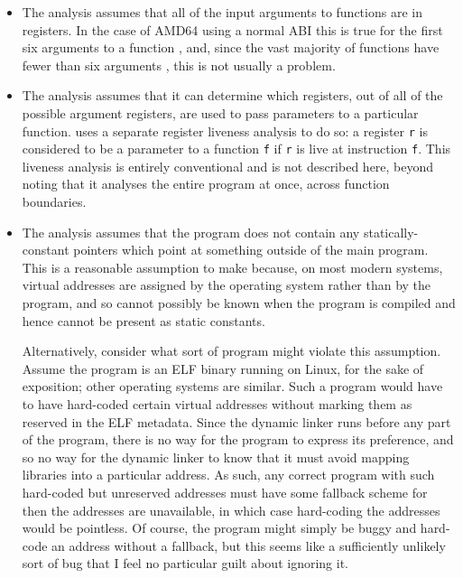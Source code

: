 \begin{itemize}
\item
  The analysis assumes that all of the input arguments to functions
  are in registers.  In the case of AMD64 using a normal ABI this is
  true for the first six arguments to a function \needCite{}, and,
  since the vast majority of functions have fewer than six arguments
  \needCite{}, this is not usually a problem.  

\item
  The analysis assumes that it can determine which registers, out of
  all of the possible argument registers, are used to pass parameters
  to a particular function.  {\Implementation} uses a separate
  register liveness analysis to do so: a register \verb|r| is
  considered to be a parameter to a function \verb|f| if \verb|r| is
  live at instruction \verb|f|.  This liveness analysis is entirely
  conventional and is not described here, beyond noting that it
  analyses the entire program at once, across function boundaries.

\item
  The analysis assumes that the program does not contain any
  statically-constant pointers which point at something outside of the
  main program.  This is a reasonable assumption to make because, on
  most modern systems, virtual addresses are assigned by the operating
  system rather than by the program, and so cannot possibly be known
  when the program is compiled and hence cannot be present as static
  constants.

  Alternatively, consider what sort of program might violate this
  assumption.  Assume the program is an ELF binary running on Linux,
  for the sake of exposition; other operating systems are similar.
  Such a program would have to have hard-coded certain virtual
  addresses without marking them as reserved in the ELF metadata.
  Since the dynamic linker runs before any part of the program, there
  is no way for the program to express its preference, and so no way
  for the dynamic linker to know that it must avoid mapping libraries
  into a particular address.  As such, any correct program with such
  hard-coded but unreserved addresses must have some fallback scheme
  for then the addresses are unavailable, in which case hard-coding
  the addresses would be pointless.  Of course, the program might
  simply be buggy and hard-code an address without a fallback, but
  this seems like a sufficiently unlikely sort of bug that I feel no
  particular guilt about ignoring it.  


\end{itemize}
